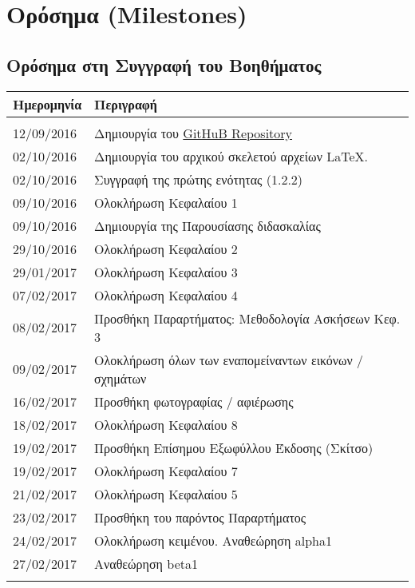 \chapter{Ορόσημα (Milestones)}
\newpage
\section{Ορόσημα στη Συγγραφή του Βοηθήματος}

\begin{tabular}{ll}
\textbf{Ημερομηνία} & \textbf{Περιγραφή} \\
\hline\\
 12/09/2016 & Δημιουργία του \href{https://github.com/sonic2000gr/diktia}{GitHuB Repository}\\ 
 02/10/2016 & Δημιουργία του αρχικού σκελετού αρχείων \LaTeX.\\
 02/10/2016 & Συγγραφή της πρώτης ενότητας (1.2.2)\\
 09/10/2016 & Ολοκλήρωση Κεφαλαίου 1\\
 09/10/2016 & Δημιουργία της Παρουσίασης διδασκαλίας\\
 29/10/2016 & Ολοκλήρωση Κεφαλαίου 2\\
 29/01/2017 & Ολοκλήρωση Κεφαλαίου 3\\
 07/02/2017 & Ολοκλήρωση Κεφαλαίου 4\\
 08/02/2017 & Προσθήκη Παραρτήματος: Μεθοδολογία Ασκήσεων Κεφ. 3\\
 09/02/2017 & Ολοκλήρωση όλων των εναπομείναντων εικόνων / σχημάτων\\
 16/02/2017 & Προσθήκη φωτογραφίας / αφιέρωσης\\
 18/02/2017 & Ολοκλήρωση Κεφαλαίου 8\\
 19/02/2017 & Προσθήκη Επίσημου Εξωφύλλου Έκδοσης (Σκίτσο)\\
 19/02/2017 & Ολοκλήρωση Κεφαλαίου 7\\
 21/02/2017 & Ολοκλήρωση Κεφαλαίου 5\\
 23/02/2017 & Προσθήκη του παρόντος Παραρτήματος\\
 24/02/2017 & Ολοκλήρωση κειμένου. Αναθεώρηση alpha1\\
 27/02/2017 & Αναθεώρηση beta1\\\\
\hline
\end{tabular}

